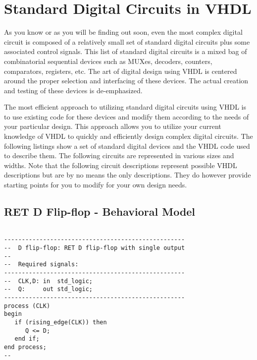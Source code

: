 %
%
\chapter{Standard Digital Circuits in VHDL}
As you know or as you will be finding out soon, even the most complex digital circuit is composed of a relatively small set of standard digital circuits plus some associated control signals. This list of standard digital circuits is a mixed bag of combinatorial sequential devices such as MUXes, decoders, counters, comparators, registers, etc. The art of digital design using VHDL is centered around the proper selection and interfacing of these devices. The actual creation and testing of these devices is de-emphasized. 

The most efficient approach to utilizing standard digital circuits using VHDL is to use existing code for these devices and modify them according to the needs of your particular design. This approach allows you to utilize your current knowledge of VHDL to quickly and efficiently design complex digital circuits. The following listings show a set of standard digital devices and the VHDL code used to describe them. The following circuits are represented in various sizes and widths. Note that the following circuit descriptions represent possible VHDL descriptions but are by no means the only descriptions. They do however provide starting points for you to modify for your own design needs. 

\section{RET D Flip-flop - Behavioral Model}

\noindent
\begin{minipage}{0.99\linewidth}
\begin{lstlisting}

---------------------------------------------------
--  D flip-flop: RET D flip-flop with single output
--
--  Required signals: 
---------------------------------------------------
--  CLK,D: in  std_logic;
--  Q:     out std_logic;
---------------------------------------------------
process (CLK) 
begin
   if (rising_edge(CLK)) then  
      Q <= D;
   end if;
end process;
--
\end{lstlisting}
\end{minipage}

